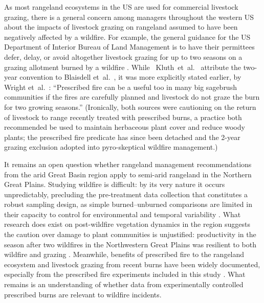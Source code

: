 \documentclass[fire,article,accept,oneauthor,pdftex]{Definitions/mdpi}
\begin{document}
As most rangeland ecosystems in the US are used for commercial livestock grazing, there is a general concern among managers throughout the western US about the impacts of livestock grazing on rangeland assumed to have been negatively affected by a wildfire. 
For example, the general guidance for the US Department of Interior Bureau of Land Management is to have their permittees defer, delay, or avoid altogether livestock grazing for up to two seasons on a grazing allotment burned by a wildfire \cite{blm2007}. 
While %
\mbox{ Kluth et~al.~\cite{kluth2024}} attribute the two-year convention to Blaisdell et~al.~\cite{blaisdell1982}, it was more explicitly stated earlier, by Wright et~al.~\cite[][p. 9]{wright1979}: ``Prescribed fire can be a useful too in many big sagebrush communities if the fires are carefully planned and livestock do not graze the burn for two growing seasons.''
(Ironically, both sources were cautioning on the return of livestock to range recently treated with prescribed burns, a practice both recommended be used to maintain herbaceous plant cover and reduce woody plants; the prescribed fire predicate has since been detached and the 2-year grazing exclusion adopted into pyro-skeptical wildfire management.)

It remains an open question whether rangeland management recommendations from the arid Great Basin region apply to semi-arid rangeland in the Northern Great Plains. 
Studying wildfire is difficult: by its very nature it occurs unpredictably, precluding the pre-treatment data collection that constitutes a robust sampling design, as simple burned--unburned comparisons are limited in their capacity to control for environmental and temporal variability \cite{zaitsev2016}. 
What research does exist on post-wildfire vegetation dynamics in the region suggests the caution over damage to plant communities is unjustified: productivity in the season after two wildfires in the Northwestern Great Plains was resilient to both wildfire and grazing \cite{gates2017, kral-obrien2020, williams2022}. 
Meanwhile, benefits of prescribed fire to the rangeland ecosystem and livestock grazing from %
recent burns have been widely documented, especially from the prescribed fire experiments included in this study \cite{powell2018, spiess2024, mcgranahan2022, wanchuk2024, wanchuk2024a}.
What remains is an understanding of whether data from experimentally controlled prescribed burns are relevant to wildfire incidents. 
\end{document}
